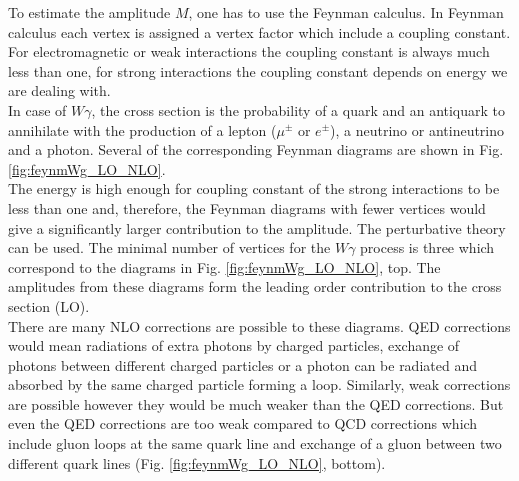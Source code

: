 To estimate the amplitude $M$, one has to use the Feynman calculus. In Feynman calculus each vertex is assigned a vertex factor which include a coupling constant. For electromagnetic or weak interactions the coupling constant is always much less than one, for strong interactions the coupling constant depends on energy we are dealing with.  \\

In case of $W\gamma$, the cross section is the probability of a quark and an antiquark to annihilate with the production of a lepton ($\mu^{\pm}$ or $e^{\pm}$), a neutrino or antineutrino and a photon. Several of the corresponding Feynman diagrams are shown in Fig. \ref{fig:feynmWg_LO_NLO}. \\

The energy is high enough for coupling constant of the strong interactions to be less than one and, therefore, the Feynman diagrams with fewer vertices would give a significantly larger contribution to the amplitude. The perturbative theory can be used. The minimal number of vertices for the $W\gamma$ process is three which correspond to the diagrams in Fig. \ref{fig:feynmWg_LO_NLO}, top. The amplitudes from these diagrams form the leading order contribution to the cross section (LO).\\ 

There are many NLO corrections are possible to these diagrams. QED corrections would mean radiations of extra photons by charged particles, exchange of photons between different charged particles or a photon can be radiated and absorbed by the same charged particle forming a loop. Similarly, weak corrections are possible however they would be much weaker than the QED corrections. But even the QED corrections are too weak compared to QCD corrections which include gluon loops at the same quark line and exchange of a gluon between two different quark lines (Fig. \ref{fig:feynmWg_LO_NLO}, bottom).\\

